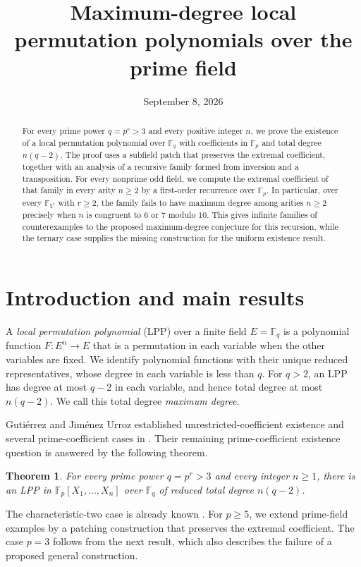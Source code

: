 \documentclass[11pt]{article}
\title{Maximum-degree local permutation polynomials over the prime field}
\author{}
\date{September 8, 2026}
\newtheorem{theorem}{Theorem}
\theoremstyle{remark}\newtheorem{remark}[theorem]{Remark}
\newcommand{\F}{\mathbb F}
\begin{document}
\maketitle
\begin{abstract}
For every prime power $q=p^r>3$ and every positive integer $n$, we prove the
existence of a local permutation polynomial over $\F_q$ with coefficients in
$\F_p$ and total degree $n(q-2)$. The proof uses a subfield patch that preserves
the extremal coefficient, together with an analysis of a recursive family
formed from inversion and a transposition. For every nonprime odd field, we
compute the extremal coefficient of that family in every arity $n\geq2$ by a first-order
recurrence over $\F_p$. In particular, over every $\F_{5^r}$ with $r\geq2$, the
family fails to have maximum degree among arities $n\geq2$ precisely when
$n$ is congruent to $6$ or $7$ modulo $10$. This gives infinite families of counterexamples to the proposed
maximum-degree conjecture for this recursion, while the ternary case supplies
the missing construction for the uniform existence result.
\end{abstract}

\section{Introduction and main results}

A \emph{local permutation polynomial} (LPP) over a finite field $E=\F_q$ is a
polynomial function $F:E^n\to E$ that is a permutation in each variable when the
other variables are fixed. We identify polynomial functions with their unique
reduced representatives, whose degree in each variable is less than $q$.
For $q>2$, an LPP has degree at most $q-2$ in each variable, and hence total
degree at most $n(q-2)$. We call this total degree \emph{maximum degree}.

Guti\'errez and Jim\'enez Urroz established unrestricted-coefficient existence
and several prime-coefficient cases in \cite{GJU-afr,GJU-mal}. Their remaining
prime-coefficient existence question is answered by the following theorem.

\begin{theorem}\label{thm:exist}
For every prime power $q=p^r>3$ and every integer $n\geq1$, there is an LPP in
$\F_p[X_1,\ldots,X_n]$ over $\F_q$ of reduced total degree $n(q-2)$.
\end{theorem}

The characteristic-two case is already known \cite[Theorem 4]{GJU-afr}.
For $p\geq5$, we extend prime-field examples by a patching construction that
preserves the extremal coefficient. The case $p=3$ follows from the next
result, which also describes the failure of a proposed general construction.
\end{document}
